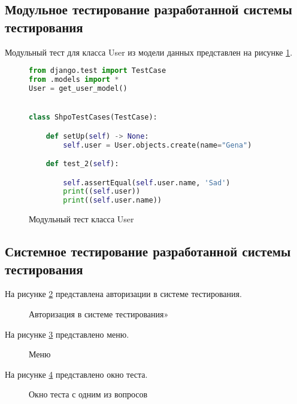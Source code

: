 \subsection{Модульное тестирование разработанной системы тестирования}

Модульный тест для класса User из модели данных представлен на рисунке \ref{unitUser:image}.

\begin{figure}[ht]
\begin{lstlisting}[language=Python]
from django.test import TestCase
from .models import *
User = get_user_model()


class ShpoTestCases(TestCase):

    def setUp(self) -> None:
        self.user = User.objects.create(name="Gena")

    def test_2(self):

        self.assertEqual(self.user.name, 'Sad')
        print((self.user))
        print((self.user.name))
\end{lstlisting}  
\caption{Модульный тест класса User}
\label{unitUser:image}
\end{figure}

\subsection{Системное тестирование разработанной системы тестирования}

На рисунке \ref{authorisation:image} представлена авторизации в системе тестирования.
\begin{figure}[H] %
\caption{Авторизация в системе тестирования»}
\label{authorisation:image}
\end{figure}

На рисунке \ref{menu1:image} представлено меню.

\begin{figure}[H]
\caption{Меню}
\label{menu1:image}
\end{figure}

На рисунке \ref{test:image} представлено окно теста.

\begin{figure}[H]
\caption{Окно теста с одним из вопросов}
\label{test:image}
\end{figure}
